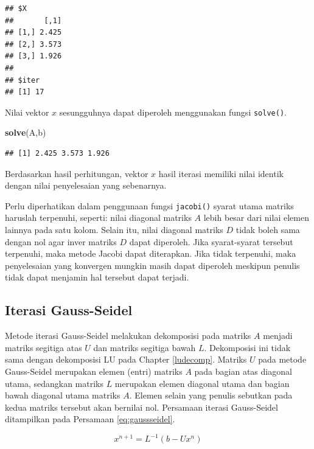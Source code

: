 \documentclass[
]{book}
\newenvironment{Shaded}{\begin{snugshade}}{\end{snugshade}}
\newcommand{\FunctionTok}[1]{\textcolor[rgb]{0.13,0.29,0.53}{\textbf{#1}}}
\newcommand{\NormalTok}[1]{#1}
\theoremstyle{definition}
\theoremstyle{definition}
\theoremstyle{definition}
\theoremstyle{definition}
\theoremstyle{remark}
\begin{document}
\begin{verbatim}
## $X
##       [,1]
## [1,] 2.425
## [2,] 3.573
## [3,] 1.926
## 
## $iter
## [1] 17
\end{verbatim}

Nilai vektor \(x\) sesungguhnya dapat diperoleh menggunakan fungsi \texttt{solve()}.

\begin{Shaded}
\begin{Highlighting}[]
\FunctionTok{solve}\NormalTok{(A,b)}
\end{Highlighting}
\end{Shaded}

\begin{verbatim}
## [1] 2.425 3.573 1.926
\end{verbatim}

Berdasarkan hasil perhitungan, vektor \(x\) hasil iterasi memiliki nilai identik dengan nilai penyelesaian yang sebenarnya.

Perlu diperhatikan dalam penggunaan fungsi \texttt{jacobi()} syarat utama matriks haruslah terpenuhi, seperti: nilai diagonal matriks \(A\) lebih besar dari nilai elemen lainnya pada satu kolom. Selain itu, nilai diagonal matriks \(D\) tidak boleh sama dengan nol agar inver matriks \(D\) dapat diperoleh. Jika syarat-syarat tersebut terpenuhi, maka metode Jacobi dapat diterapkan. Jika tidak terpenuhi, maka penyelesaian yang konvergen mungkin masih dapat diperoleh meskipun penulis tidak dapat menjamin hal tersebut dapat terjadi.

\hypertarget{seideliter}{%
\subsection{Iterasi Gauss-Seidel}\label{seideliter}}

Metode iterasi Gauss-Seidel melakukan dekomposisi pada matriks \(A\) menjadi matriks segitiga atas \(U\) dan matriks segitiga bawah \(L\). Dekomposisi ini tidak sama dengan dekomposisi LU pada Chapter \ref{ludecomp}. Matriks \(U\) pada metode Gauss-Seidel merupakan elemen (entri) matriks \(A\) pada bagian atas diagonal utama, sedangkan matriks \(L\) merupakan elemen diagonal utama dan bagian bawah diagonal utama matriks \(A\). Elemen selain yang penulis sebutkan pada kedua matriks tersebut akan bernilai nol. Persamaan iterasi Gauss-Seidel ditampilkan pada Persamaan \eqref{eq:gaussseidel}.

\begin{equation}
x^{n+1}=L^{-1}\left(b-Ux^{n}\right)
 \label{eq:gaussseidel}
\end{equation}
\end{document}
